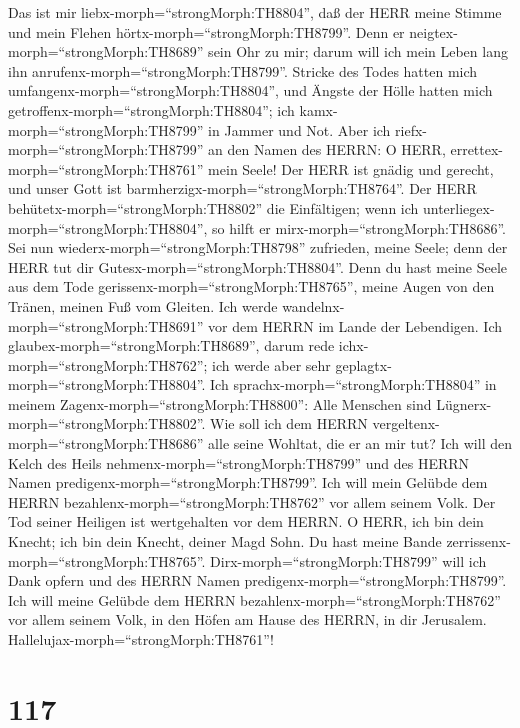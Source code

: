  Das ist mir liebx-morph=``strongMorph:TH8804'', daß der
HERR meine Stimme und mein Flehen hörtx-morph=``strongMorph:TH8799''.
 Denn er neigtex-morph=``strongMorph:TH8689'' sein Ohr zu
mir; darum will ich mein Leben lang ihn
anrufenx-morph=``strongMorph:TH8799''.  Stricke des Todes
hatten mich umfangenx-morph=``strongMorph:TH8804'', und Ängste der Hölle
hatten mich getroffenx-morph=``strongMorph:TH8804''; ich
kamx-morph=``strongMorph:TH8799'' in Jammer und Not.  Aber
ich riefx-morph=``strongMorph:TH8799'' an den Namen des HERRN: O HERR,
errettex-morph=``strongMorph:TH8761'' mein Seele!  Der HERR
ist gnädig und gerecht, und unser Gott ist
barmherzigx-morph=``strongMorph:TH8764''.  Der HERR
behütetx-morph=``strongMorph:TH8802'' die Einfältigen; wenn ich
unterliegex-morph=``strongMorph:TH8804'', so hilft er
mirx-morph=``strongMorph:TH8686''.  Sei nun
wiederx-morph=``strongMorph:TH8798'' zufrieden, meine Seele; denn der
HERR tut dir Gutesx-morph=``strongMorph:TH8804''.  Denn du
hast meine Seele aus dem Tode gerissenx-morph=``strongMorph:TH8765'',
meine Augen von den Tränen, meinen Fuß vom Gleiten.  Ich
werde wandelnx-morph=``strongMorph:TH8691'' vor dem HERRN im Lande der
Lebendigen.  Ich glaubex-morph=``strongMorph:TH8689'',
darum rede ichx-morph=``strongMorph:TH8762''; ich werde aber sehr
geplagtx-morph=``strongMorph:TH8804''.  Ich
sprachx-morph=``strongMorph:TH8804'' in meinem
Zagenx-morph=``strongMorph:TH8800'': Alle Menschen sind
Lügnerx-morph=``strongMorph:TH8802''.  Wie soll ich dem
HERRN vergeltenx-morph=``strongMorph:TH8686'' alle seine Wohltat, die er
an mir tut?  Ich will den Kelch des Heils
nehmenx-morph=``strongMorph:TH8799'' und des HERRN Namen
predigenx-morph=``strongMorph:TH8799''.  Ich will mein
Gelübde dem HERRN bezahlenx-morph=``strongMorph:TH8762'' vor allem
seinem Volk.  Der Tod seiner Heiligen ist wertgehalten vor
dem HERRN.  O HERR, ich bin dein Knecht; ich bin dein
Knecht, deiner Magd Sohn. Du hast meine Bande
zerrissenx-morph=``strongMorph:TH8765''. 
Dirx-morph=``strongMorph:TH8799'' will ich Dank opfern und des HERRN
Namen predigenx-morph=``strongMorph:TH8799''.  Ich will
meine Gelübde dem HERRN bezahlenx-morph=``strongMorph:TH8762'' vor allem
seinem Volk,  in den Höfen am Hause des HERRN, in dir
Jerusalem. Hallelujax-morph=``strongMorph:TH8761''!

\hypertarget{section-116}{%
\section{117}\label{section-116}}

